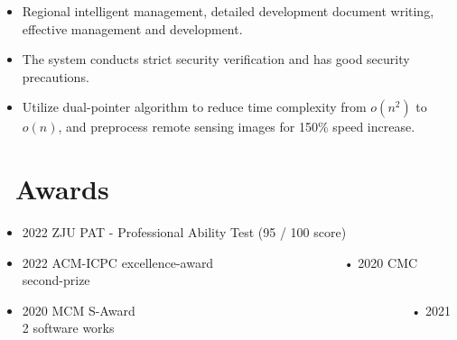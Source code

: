 \documentclass{resume}
\begin{document}
\begin{itemize}
  \item Regional intelligent management, detailed development document writing, effective management and development.
  \item The system conducts strict security verification and has good security precautions.
  \item Utilize dual-pointer algorithm to reduce time complexity from \(\mathbf{\mathit{o(n^{2})}}\) to \(\mathbf{\mathit{o(n)}}\), and preprocess remote sensing images for 150\% speed increase.
\end{itemize}




\section{\faCalendarCheckO\ Awards}
\begin{itemize}[parsep=0.5ex]
  \item 2022 ZJU PAT - Professional Ability Test (95 / 100 score) 
  \item 2022 ACM-ICPC excellence-award \ \ \ \ \ \ \ \ \ \ \ \ \ \ \ \ \ \ \ \  • 2020 CMC second-prize
  \item 2020 MCM S-Award \ \ \ \ \ \ \ \ \ \ \ \ \ \ \ \ \ \ \ \ \ \ \ \ \ \ \ \ \ \ \ \ \ \ \ \ \ \ \ \ \ \ \ • 2021 2 software works
\end{itemize}
\end{document}
